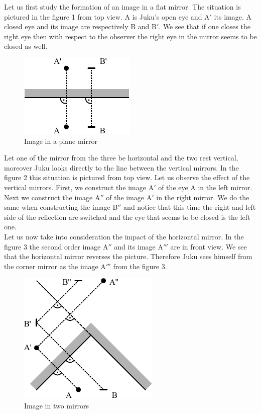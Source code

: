 \solueng
Let us first study the formation of an image in a flat mirror. The situation is pictured in the figure 1 from top view. A is Juku’s open eye and A$'$ its image. A closed eye and its image are respectively B and B$'$. We see that if one closes the right eye then with respect to the observer the right eye in the mirror seems to be closed as well. 
\begin{figure}[h]
	\centerline{\includegraphics[scale=1.2]{2016-v3g-08-nurgapeegel_j1}}
	\caption{Image in a plane mirror}
\end{figure}
Let one of the mirror from the three be horizontal and the two rest vertical, moreover Juku looks directly to the line between the vertical mirrors. In the figure 2 this situation is pictured from top view. Let us observe the effect of the vertical mirrors. First, we construct the image A$'$ of the eye A in the left mirror. Next we construct the image A$''$ of the image A$'$ in the right mirror. We do the same when constructing the image B$''$ and notice that this time the right and left side of the reflection are switched and the eye that seems to be closed is the left one.\\
Let us now take into consideration the impact of the horizontal mirror. In the figure 3 the second order image A$''$ and its image A$'''$ are in front view. We see that the horizontal mirror reverses the picture. Therefore Juku sees himself from the corner mirror as the image A$'''$ from the figure 3. 
\begin{figure}[h]
	\centerline{\includegraphics[scale=1.2]{2016-v3g-08-nurgapeegel_j2}}
	\caption{Image in two mirrors}
\end{figure}
